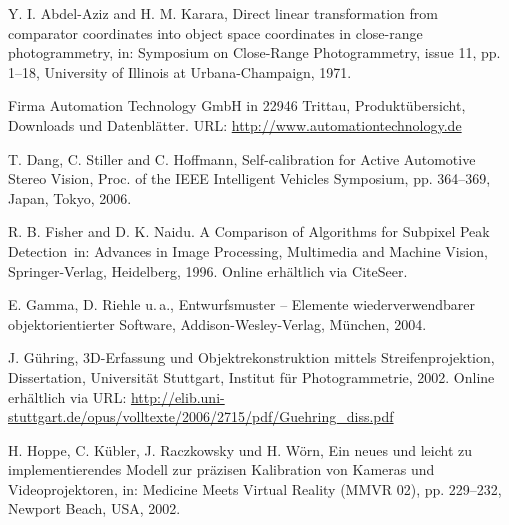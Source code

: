 %



\begin{thebibliography}{Ti}



 Y. I. Abdel-Aziz and H. M. Karara, \glqq Direct linear transformation from comparator coordinates into object space coordinates in close-range photogrammetry\grqq, in: Symposium on Close-Range Photogrammetry, issue 11, pp. 1--18, University of Illinois at Urbana-Champaign, 1971.

 Firma Automation Technology GmbH in 22946 Trittau, Produktübersicht, Downloads und Datenblätter.  URL: \url{http://www.automationtechnology.de}

 T. Dang, C. Stiller and C. Hoffmann, \glqq Self-calibration for Active Automotive
Stereo Vision\grqq, Proc. of the IEEE Intelligent Vehicles Symposium, pp. 364--369, Japan, Tokyo, 2006.

 R. B. Fisher and D. K. Naidu. \glqq A Comparison of Algorithms for Subpixel Peak Detection\grqq\, in: Advances in Image Processing, Multimedia and Machine Vision, Springer-Verlag, Heidelberg, 1996. Online erhältlich via CiteSeer.

 E. Gamma, D. Riehle u.\,a., \glqq Entwurfsmuster -- Elemente wiederverwendbarer objektorientierter Software\grqq, Addison-Wesley-Verlag, München, 2004.

 J. Gühring, \glqq 3D-Erfassung und Objektrekonstruktion mittels Streifenprojektion\grqq, Dissertation, Universität Stuttgart, Institut für Photogrammetrie, 2002. Online erhältlich via URL: \url{http://elib.uni-stuttgart.de/opus/volltexte/2006/2715/pdf/Guehring_diss.pdf}

 H. Hoppe, C. Kübler, J. Raczkowsky und H. Wörn, \glqq Ein neues und leicht zu implementierendes
Modell zur präzisen Kalibration von Kameras und Videoprojektoren\grqq, in: Medicine Meets Virtual Reality (MMVR 02), pp. 229--232, Newport Beach, USA, 2002.


\end{thebibliography}

